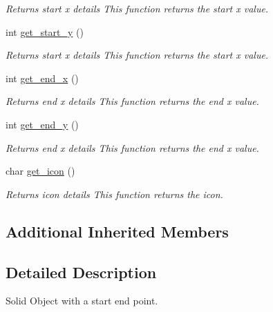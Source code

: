 \begin{DoxyCompactItemize}
\begin{DoxyCompactList}\small\item\em Returns start x details This function returns the start x value. \end{DoxyCompactList}\item 
\mbox{\label{classobstacle_a0166e8c89c16c6c40f87fdae232d160b}} 
int \hyperlink{classobstacle_a0166e8c89c16c6c40f87fdae232d160b}{get\+\_\+start\+\_\+y} ()
\begin{DoxyCompactList}\small\item\em Returns start x details This function returns the start x value. \end{DoxyCompactList}\item 
\mbox{\label{classobstacle_af51bb5ce1a36f954b39c667a82464046}} 
int \hyperlink{classobstacle_af51bb5ce1a36f954b39c667a82464046}{get\+\_\+end\+\_\+x} ()
\begin{DoxyCompactList}\small\item\em Returns end x details This function returns the end x value. \end{DoxyCompactList}\item 
\mbox{\label{classobstacle_add9b03205e5ea6768d70357e9d3f7e08}} 
int \hyperlink{classobstacle_add9b03205e5ea6768d70357e9d3f7e08}{get\+\_\+end\+\_\+y} ()
\begin{DoxyCompactList}\small\item\em Returns end x details This function returns the end x value. \end{DoxyCompactList}\item 
\mbox{\label{classobstacle_a7eb291920f0286d4bb98b1b6a1e10bf2}} 
char \hyperlink{classobstacle_a7eb291920f0286d4bb98b1b6a1e10bf2}{get\+\_\+icon} ()
\begin{DoxyCompactList}\small\item\em Returns icon details This function returns the icon. \end{DoxyCompactList}\end{DoxyCompactItemize}
\subsection*{Additional Inherited Members}


\subsection{Detailed Description}
Solid Object with a start end point. 

